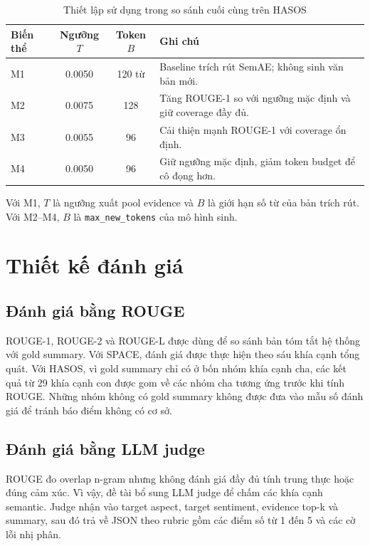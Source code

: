 \begin{table}[H]
\centering
\caption{Thiết lập sử dụng trong so sánh cuối cùng trên HASOS}
\label{tab:optimal-hasos-settings}
\begin{threeparttable}
\begin{tabular}{l c c l}
\toprule
\textbf{Biến thể} & \textbf{Ngưỡng \(T\)} & \textbf{Token \(B\)} & \textbf{Ghi chú} \\
\midrule
M1 & 0.0050 & 120 từ & Baseline trích rút SemAE; không sinh văn bản mới. \\
M2 & 0.0075 & 128 & Tăng ROUGE-1 so với ngưỡng mặc định và giữ coverage đầy đủ. \\
M3 & 0.0055 & 96 & Cải thiện mạnh ROUGE-1 với coverage ổn định. \\
M4 & 0.0050 & 96 & Giữ ngưỡng mặc định, giảm token budget để cô đọng hơn. \\
\bottomrule
\end{tabular}
\begin{tablenotes}
\footnotesize
\item Với M1, \(T\) là ngưỡng xuất pool evidence và \(B\) là giới hạn số từ của bản trích rút. Với M2--M4, \(B\) là \texttt{max\_new\_tokens} của mô hình sinh.
\end{tablenotes}
\end{threeparttable}
\end{table}

\section{Thiết kế đánh giá}

\subsection{Đánh giá bằng ROUGE}

ROUGE-1, ROUGE-2 và ROUGE-L được dùng để so sánh bản tóm tắt hệ thống với gold summary. Với SPACE, đánh giá được thực hiện theo sáu khía cạnh tổng quát. Với HASOS, vì gold summary chỉ có ở bốn nhóm khía cạnh cha, các kết quả từ 29 khía cạnh con được gom về các nhóm cha tương ứng trước khi tính ROUGE. Những nhóm không có gold summary không được đưa vào mẫu số đánh giá để tránh báo điểm không có cơ sở.

\subsection{Đánh giá bằng LLM judge}

ROUGE đo overlap n-gram nhưng không đánh giá đầy đủ tính trung thực hoặc đúng cảm xúc. Vì vậy, đề tài bổ sung LLM judge để chấm các khía cạnh semantic. Judge nhận vào target aspect, target sentiment, evidence top-k và summary, sau đó trả về JSON theo rubric gồm các điểm số từ 1 đến 5 và các cờ lỗi nhị phân.

